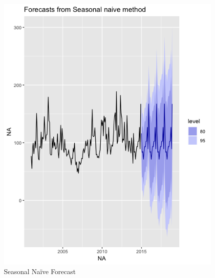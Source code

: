 \documentclass[12pt]{article}
\begin{document}
\pagebreak
\begin{figure}[!tbp]
  \begin{minipage}[b]{0.49\textwidth}
    \includegraphics[width=\textwidth]{Pre_sn.png}
    \caption{Seasonal Naïve Forecast}
  \end{minipage}
  \hfill
  \begin{minipage}[b]{0.49\textwidth}

\end{minipage}
\end{figure}
\end{document}
